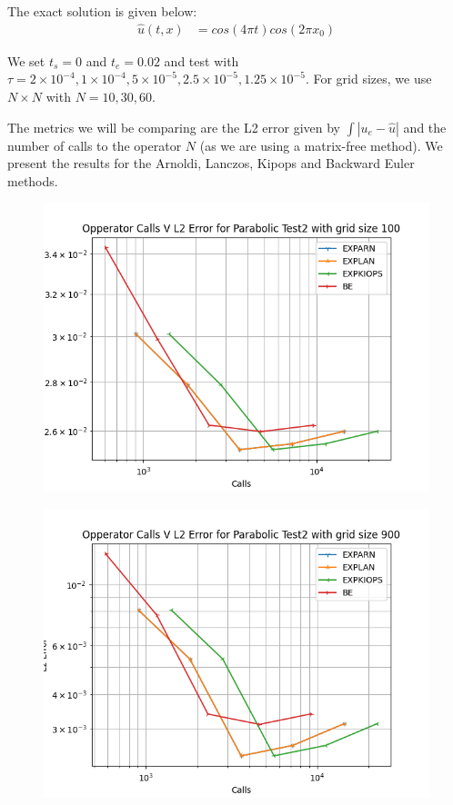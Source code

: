 \documentclass{article}
\begin{document}
The exact solution is given below:
\begin{align*}
\hat u(t,x) &= cos(4\pi t)cos(2\pi x_0)
\end{align*}

We set $t_s = 0$ and $t_e = 0.02$ and test with $\tau = 2\times 10^{-4}, 1\times 10^{-4}, 5\times 10^{-5}, 2.5\times 10^{-5}, 1.25\times 10^{-5}$.
For grid sizes, we use $N\times N$ with $N = 10,30,60$.

The metrics we will be comparing are the L2 error given by $\int |u_e - \hat u|$ and the number of calls to the operator $N$ (as we are using a matrix-free method).
We present the results for the Arnoldi, Lanczos, Kipops\cite{Gaudreault2018} and Backward Euler methods.

\begin{figure}[H]
	  \includegraphics[width=\linewidth]{FEMethodPlots/Operator Calls V Error for Parabolic Test2 with grid size 100.png}
\end{figure}
\begin{figure}[H]
	  \includegraphics[width=\linewidth]{FEMethodPlots/Operator Calls V Error for Parabolic Test2 with grid size 900.png}
\end{figure}
\end{document}
